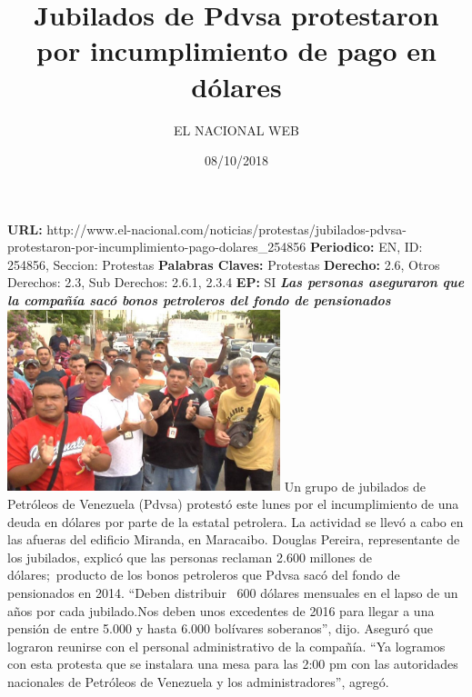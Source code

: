 \documentclass{article}%
\title{\textbf{Jubilados de Pdvsa protestaron por incumplimiento de pago en dólares}}%
\author{EL NACIONAL WEB}%
\date{08/10/2018}%
\begin{document}
%
\normalsize%
\maketitle%
\textbf{URL: }%
http://www.el{-}nacional.com/noticias/protestas/jubilados{-}pdvsa{-}protestaron{-}por{-}incumplimiento{-}pago{-}dolares\_254856\newline%
%
\textbf{Periodico: }%
EN, %
ID: %
254856, %
Seccion: %
Protestas\newline%
%
\textbf{Palabras Claves: }%
Protestas\newline%
%
\textbf{Derecho: }%
2.6, %
Otros Derechos: %
2.3, %
Sub Derechos: %
2.6.1, 2.3.4\newline%
%
\textbf{EP: }%
SI\newline%
\newline%
%
\textbf{\textit{Las personas aseguraron que la compañía sacó bonos petroleros del fondo de pensionados~}}%
\newline%
\newline%
%
\includegraphics[width=300px]{247.jpg}%
\newline%
%
Un grupo de jubilados de Petróleos de Venezuela (Pdvsa) protestó este lunes por el incumplimiento de una deuda en dólares por parte de la estatal petrolera.%
\newline%
%
La actividad se llevó a cabo en las afueras del edificio Miranda, en Maracaibo.%
\newline%
%
Douglas Pereira, representante de los jubilados, explicó que las personas reclaman 2.600 millones de dólares;~producto de los bonos petroleros que Pdvsa sacó del fondo de pensionados en 2014.%
\newline%
%
“Deben distribuir~ 600 dólares mensuales en el lapso de un años por cada jubilado.Nos deben unos excedentes de 2016 para llegar a una pensión de entre 5.000 y hasta 6.000 bolívares soberanos”, dijo.%
\newline%
%
Aseguró que lograron reunirse con el personal administrativo de la compañía. “Ya logramos con esta protesta que se instalara una mesa para las 2:00 pm con las autoridades nacionales de Petróleos de Venezuela y los administradores”, agregó.%
\newline%
%
\end{document}
